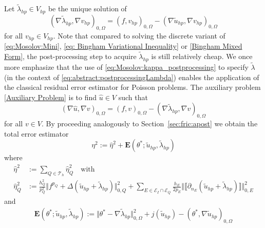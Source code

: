 \documentclass[12pt,twoside,reqno]{amsart}
\theoremstyle{definition}
\numberwithin{equation}{section}
\newcommand  {\T}   {\mathscr T}
\newcommand{\norm}[1]    {\Vert #1 \Vert}
\begin{document}
            Let $\tilde{\lambda}_{hp}\in V_{hp}$ be the unique solution of
            \begin{equation} \label{eq:Mosolov:kappa_postprocessing}
                (\nabla\tilde{\lambda}_{hp},\nabla v_{hp})_{0,\Omega} = (f,v_{hp})_{0,\Omega}-(\nabla \tilde{u}_{hp},\nabla v_{hp})_{0,\Omega}
            \end{equation}
            for all $v_{hp}\in V_{hp}$. Note that compared to solving the discrete variant of \eqref{eq:Mosolov:Mini}, \eqref{eq: Bingham Variational Inequality} or \eqref{Bingham Mixed Form}, the post-processing step to acquire $\tilde{\lambda}_{hp}$ is still relatively cheap.  We once more emphasize that 
             the use of \eqref{eq:Mosolov:kappa_postprocessing}  to specify $\tilde{\lambda}$ (in the context of \eqref{eq:abstract:postprocessingLambda})
            enables the application of the classical residual error estimator for Poisson problems.  
            The auxiliary problem \eqref{Auxiliary Problem} is to find $\hat{u}\in V$ such that
            \begin{equation*}%
                (\nabla \hat{u},\nabla v)_{0,\Omega} = (f,v)_{0,\Omega}-(\nabla\tilde{\lambda}_{hp},\nabla v)_{0,\Omega}
            \end{equation*}
            for all $v\in V$.
            By proceeding analogously to Section~\ref{sec:fric:apost} we obtain the total error estimator
            \begin{equation*}
                \eta^2:=\hat{\eta}^2+\bm{E}(\theta^*;\tilde{u}_{hp},\tilde{\lambda}_{hp}) 
            \end{equation*}
            where
            \begin{align*}
                \hat\eta^2&:=\sum\limits_{Q\in \T_h}\hat\eta_Q^2 \quad \text{with}\\  
                    \hat\eta_Q^2&:= \frac{h_Q^2}{p_Q^2}\norm{f^{p_Q}+\Delta (\tilde{u}_{hp}+\tilde{\lambda}_{hp})}_{0,Q}^2+ \sum\limits_{E\in \mathcal{E}_I\cap\mathcal{E}_Q}\frac{h_E}{2p_E}\norm{\llbracket \partial_{n_E}(\tilde{u}_{hp}+\tilde{\lambda}_{hp})\rrbracket}_{0,E}^2 
            \end{align*}
                and
            \begin{align*} 
                \bm{E}(\theta^*;\tilde{u}_{hp},\tilde{\lambda}_{hp}):=\norm{\theta^*-\nabla\tilde{\lambda}_{hp}}_{0,\Omega}^2+ j(\tilde{u}_{hp})-(\theta^*,\nabla \tilde{u}_{hp})_{0,\Omega}
            \end{align*}
\end{document}
